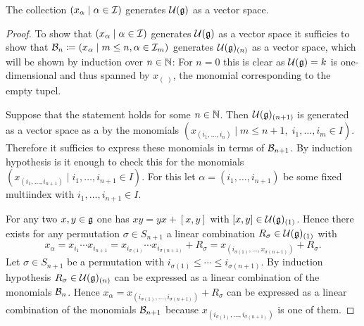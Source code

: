 \begin{lem}\label{lem: pbw concrete generating part}
 The collection $(x_\alpha \mid \alpha \in \mathcal{I})$ generates $\mathcal{U}(\mathfrak{g})$ as a vector space.
\end{lem}
\begin{proof}
 To show that $(x_\alpha \mid \alpha \in \mathcal{I})$ generates $\mathcal{U}(\mathfrak{g})$ as a vector space it sufficies to show that $\mathcal{B}_n \coloneqq (x_\alpha \mid m \leq n, \alpha \in \mathcal{I}_m)$ generates $\mathcal{U}(\mathfrak{g})_{(n)}$ as a vector space, which will be shown by induction over $n \in \mathbb{N}$: For $n = 0$ this is clear as $\mathcal{U}(\mathfrak{g}) = k$ is one-dimensional and thus spanned by $x_{(\;)}$, the monomial corresponding to the empty tupel.
 
 Suppose that the statement holds for some $n \in \mathbb{N}$. Then $\mathcal{U}(\mathfrak{g})_{(n+1)}$ is generated as a vector space as a by the monomials $(x_{(i_1, \dotsc, i_n)} \mid m \leq n+1, \; i_1, \dotsc, i_m \in I)$. Therefore it sufficies to express these monomials in terms of $\mathcal{B}_{n+1}$. By induction hypothesis is it enough to check this for the monomials $(x_{(i_1, \dotsc, i_{n+1})} \mid i_1, \dotsc, i_{n+1} \in I)$. For this let $\alpha = (i_1, \dotsc, i_{n+1})$ be some fixed multiindex with $i_1, \dotsc, i_{n+1} \in I$.
 
 For any two $x,y \in \mathfrak{g}$ one has $xy = yx + [x,y]$ with $[x,y] \in \mathcal{U}(\mathfrak{g})_{(1)}$. Hence there exists for any permutation $\sigma \in S_{n+1}$ a linear combination $R_\sigma \in \mathcal{U}(\mathfrak{g})_{(1)}$ with
 \[
  x_\alpha
  = x_{i_1} \dotsm x_{i_{n+1}}
  = x_{i_{\sigma(1)}} \dotsm x_{i_{\sigma(n+1)}} + R_\sigma
  = x_{(i_{\sigma(1)}, \dotsc, x_{\sigma(n+1)})} + R_\sigma.
 \]
 Let $\sigma \in S_{n+1}$ be a permutation with $i_{\sigma(1)} \leq \dotsb \leq i_{\sigma(n+1)}$. By induction hypothesis $R_\sigma \in \mathcal{U}(\mathfrak{g})_{(n)}$ can be expressed as a linear combination of the monomials $\mathcal{B}_n$. Hence $x_\alpha = x_{(i_{\sigma(1)}, \dotsc, i_{\sigma(n+1)})} + R_\sigma$ can be expressed as a linear combination of the monomials $\mathcal{B}_{n+1}$ because $x_{(i_{\sigma(1)}, \dotsc, i_{\sigma(n+1)})}$ is one of them.
\end{proof}


